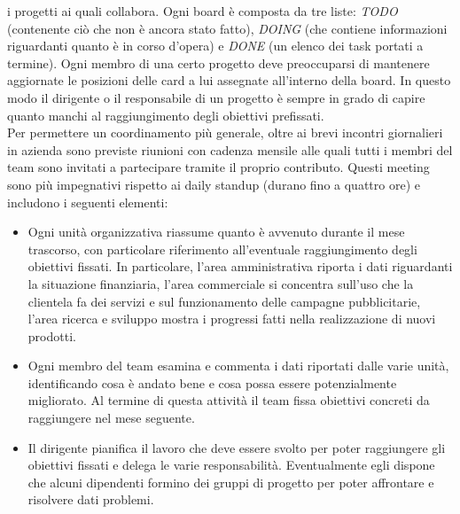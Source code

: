 				i progetti ai quali collabora. Ogni board è composta da tre liste: \emph{TODO} (contenente ciò che non è ancora
				stato fatto), \emph{DOING} (che contiene informazioni riguardanti quanto è in corso d'opera) e \emph{DONE} (un
				elenco dei task portati a termine). Ogni membro di una certo progetto deve preoccuparsi di mantenere aggiornate le
				posizioni delle card a lui assegnate all'interno della board. In questo modo il dirigente o il responsabile di un
				progetto è sempre in grado di capire quanto manchi al raggiungimento degli obiettivi prefissati.\\
				Per permettere un coordinamento più generale, oltre ai brevi incontri giornalieri in azienda sono previste riunioni
				con cadenza mensile alle quali tutti i membri del team sono invitati a partecipare tramite il proprio contributo.
				Questi meeting sono più impegnativi rispetto ai daily standup (durano fino a quattro ore) e includono i seguenti
				elementi:
				\begin{itemize}
					\item Ogni unità organizzativa riassume quanto è avvenuto durante il mese trascorso, con particolare
					riferimento all'eventuale raggiungimento degli obiettivi fissati. In particolare, l'area amministrativa
					riporta i dati riguardanti la situazione finanziaria, l'area commerciale si concentra sull'uso che la
					clientela fa dei servizi e sul funzionamento delle campagne pubblicitarie, l'area ricerca e sviluppo mostra
					i progressi fatti nella realizzazione di nuovi prodotti.
					\item Ogni membro del team esamina e commenta i dati riportati dalle varie unità, identificando cosa è andato
					bene e cosa possa essere potenzialmente migliorato. Al termine di questa attività il team fissa obiettivi
					concreti da raggiungere nel mese seguente.
					\item Il dirigente pianifica il lavoro che deve essere svolto per poter raggiungere gli obiettivi fissati e
					delega le varie responsabilità. Eventualmente egli dispone che alcuni dipendenti formino dei gruppi di
					progetto per poter affrontare e risolvere dati problemi.
				\end{itemize}
